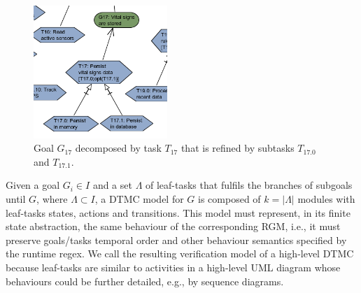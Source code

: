 \begin{figure}[ht!]
\centering
\includegraphics[width=0.45\textwidth]{imgs/RGM_REGEX.png}
\caption{Goal $G_{17}$ decomposed by task $T_{17}$ that is refined by subtasks $T_{17.0}$ and $T_{17.1}$.}
\label{fig:RGM_REGEX}
\end{figure}



Given a goal $G_i \in I$ and a set $\Lambda$ of leaf-tasks that fulfils the branches of subgoals until $G$, where $\Lambda \subset I$, a DTMC model for $G$ is composed of $k=|\Lambda|$ modules with leaf-tasks states, actions and transitions. This model must represent, in its finite state abstraction, the same behaviour of the corresponding RGM, i.e., it must preserve goals/tasks temporal order and other behaviour semantics specified by the runtime regex. We call the resulting verification model of a high-level DTMC because leaf-tasks are similar to activities in a high-level UML diagram whose behaviours could be further detailed, e.g., by sequence diagrams. 


